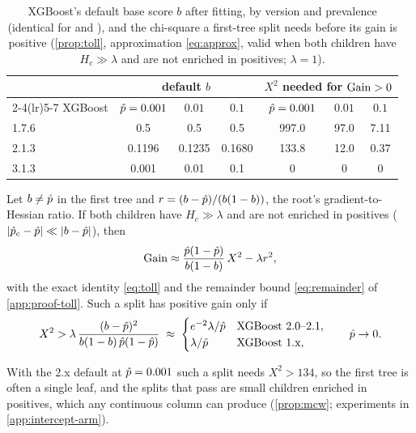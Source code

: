 \begin{table}[tbp]
\centering\small
\caption{XGBoost's default base score $b$ after fitting, by version and prevalence (identical for  and ), and the chi-square a first-tree split needs before its gain is positive (\cref{prop:toll}, approximation \eqref{eq:approx}, valid when both children have $H_c\gg\lambda$ and are not enriched in positives; $\lambda = 1$).}\label{tab:intercepts}
\begin{tabular}{lcccccc}
\toprule
 & \multicolumn{3}{c}{default $b$} & \multicolumn{3}{c}{$X^2$ needed for $\operatorname{Gain} > 0$} \\
\cmidrule(lr){2-4}\cmidrule(lr){5-7}
XGBoost & $\hat p = 0.001$ & $0.01$ & $0.1$ & $\hat p = 0.001$ & $0.01$ & $0.1$\\
\midrule
1.7.6 & 0.5 & 0.5 & 0.5 & 997.0 & 97.0 & 7.11 \\
2.1.3 & 0.1196 & 0.1235 & 0.1680 & 133.8 & 12.0 & 0.37 \\
3.1.3 & 0.001 & 0.01 & 0.1 & 0 & 0 & 0 \\
\bottomrule
\end{tabular}
\end{table}

\begin{proposition}\label{prop:toll}
Let $b \ne \hat p$ in the first tree and $r = (b-\hat p)/(b(1-b))$, the root's gradient-to-Hessian ratio. If both children have $H_c \gg \lambda$ and are not enriched in positives ($|\hat p_c - \hat p| \ll |b - \hat p|$), then
\begin{equation}\label{eq:approx}
  \operatorname{Gain} \approx \frac{\hat p(1-\hat p)}{b(1-b)}\,X^2 - \lambda r^2,
\end{equation}
with the exact identity \eqref{eq:toll} and the remainder bound \eqref{eq:remainder} of \cref{app:proof-toll}. Such a split has positive gain only if
\begin{equation}\label{eq:threshold}
  X^2 > \lambda\,\frac{(b-\hat p)^2}{b(1-b)\,\hat p(1-\hat p)}
  \;\approx\; \begin{cases} e^{-2}\lambda/\hat p & \text{XGBoost 2.0--2.1},\\ \lambda/\hat p & \text{XGBoost 1.x},\end{cases}\qquad \hat p \to 0.
\end{equation}
\end{proposition}

With the 2.x default at $\hat p = 0.001$ such a split needs $X^2 > 134$, so the first tree is often a single leaf, and the splits that pass are small children enriched in positives, which any continuous column can produce (\cref{prop:mcw}; experiments in \cref{app:intercept-arm}).

